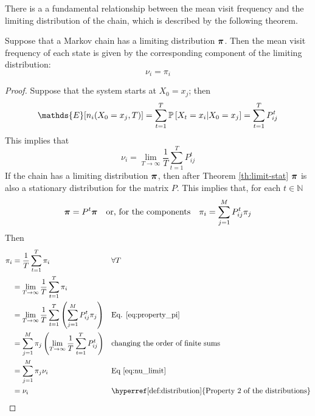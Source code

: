 \medskip
There is a a fundamental relationship between the mean visit frequency and the limiting distribution of the chain, which is described by the following theorem.

\begin{theorem}
    Suppose that a Markov chain has a limiting distribution $\boldsymbol{\pi}$. Then the mean visit frequency of each state is given by the corresponding component of the limiting distribution:
    \begin{equation}
        \nu_i = \pi_i
    \end{equation}
\end{theorem}
\begin{proof}
   Suppose that the system starts at $X_0 = x_j$; then 
    \begin{equation} \label{eq:expected_value}
        \mathds{E} [ n_i (X_0 = x_j, T)] = \sum_{t = 1}^T \prob{X_t = x_i | X_0 = x_j} = \sum_{t = 1}^T P_{ij}^t
    \end{equation} 
    This implies that 
    \begin{equation} \label{eq:nu_limit}
        \nu_i = \lim_{T\rightarrow \infty} \frac{1}{T} \sum_{t = 1}^T P_{ij}^t
    \end{equation}
    If the chain has a limiting distribution $\boldsymbol{\pi}$, then after Theorem \ref{th:limit-stat} $\boldsymbol{\pi}$ is also a stationary distribution for the matrix $P$. This implies that, for each $t\in \mathbb{N}$
    \begin{equation} \label{eq:property_pi}
        \boldsymbol{\pi} = P^t \boldsymbol{\pi}  \quad \text{or, for the components}\quad \pi_i = \sum_{j = 1}^M P_{ij}^t \pi_{j}
    \end{equation}
    Then
        \begin{align}
            \pi_i 
                &  = \frac{1}{T} \sum_{t = 1}^T \pi_i && \forall T\\
                &  = \lim_{T \rightarrow \infty} \frac{1}{T} \sum_{t = 1}^T \pi_i \\
                & = \lim_{T \rightarrow \infty}  \frac{1}{T} \sum_{t = 1}^T \left(\sum_{j = 1}^M P_{ij}^t \pi_{j}\right) &&  \text{Eq. \ref{eq:property_pi}}\\
                & = \sum_{j = 1}^M \pi_j \left(\lim_{T \rightarrow \infty}  \frac{1}{T}  \sum_{t = 1}^T P_{ij}^t \right) && \text{changing the order of finite sums} \\
                & = \sum_{j = 1}^M \pi_j \nu_i && \text{Eq \ref{eq:nu_limit}} \\
                & = \nu_i && \text{\hyperref[def:distribution] {Property 2  of the distributions}}
        \end{align}
\end{proof}